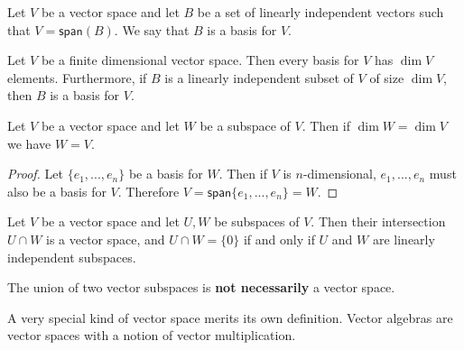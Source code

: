 \begin{defn}[Basis]
    Let $V$ be a vector space and let $B$ be a set of linearly independent vectors such that $V = \textsf{span}(B)$. We say that $B$ is a basis for $V$.
\end{defn}
\begin{thm}
    Let $V$ be a finite dimensional vector space. Then every basis for $V$ has $\dim V$ elements. Furthermore, if $B$ is a linearly independent subset of $V$ of size $\dim V$, then $B$ is a basis for $V$.
\end{thm}
\begin{thm}
    Let $V$ be a vector space and let $W$ be a subspace of $V$. Then if $\dim W = \dim V$ we have $W=V$.
\end{thm}
\begin{proof}
    Let $\{e_1,...,e_n\}$ be a basis for $W$. Then if $V$ is $n$-dimensional, $e_1,...,e_n$ must also be a basis for $V$. Therefore $V = \textsf{span}\{e_1,...,e_n\} = W$.
\end{proof}

\begin{thm}
    Let $V$ be a vector space and let $U,W$ be subspaces of $V$. Then their intersection $U\cap W$ is a vector space, and $U\cap W = \{0\}$ if and only if $U$ and $W$ are linearly independent subspaces.
\end{thm}
\begin{remark*}
    The union of two vector subspaces is \textbf{not necessarily} a vector space.
\end{remark*}
A very special kind of vector space merits its own definition. Vector algebras are vector spaces with a notion of vector multiplication. 

